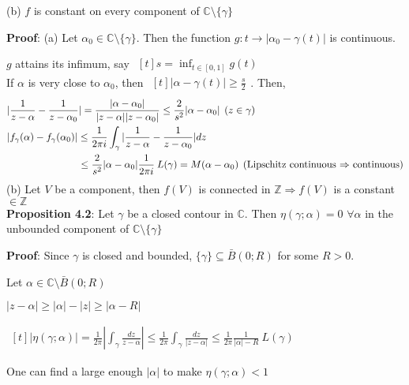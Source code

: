 \documentclass{article}
\begin{document}
\begin{flushleft}
(b) $f$ is constant on every component of $\mathds{C}\setminus \{\gamma\}$

\textbf{Proof}: (a) Let $\alpha_0 \in \mathds{C}\setminus \{\gamma\}$. Then the function $g:t \rightarrow |\alpha_0-\gamma(t)|$ is continuous.

$g$ attains its infimum, say $\begin{aligned}[t] s=\inf_{t\in[0,1]} g(t)\end{aligned}$\\
If $\alpha$ is very close to $\alpha_0$, then $\begin{aligned}[t]|\alpha-\gamma(t)|\geq \frac{s}{2}\end{aligned}$. Then,
\begin{align}
&|\frac{1}{z-\alpha}-\frac{1}{z-\alpha_0}|=\frac{|\alpha-\alpha_0|}{|z-\alpha||z-\alpha_0|}\leq \frac{2}{s^2}|\alpha-\alpha_0| \:\:(z\in \gamma)\nonumber\\
&|f_{\gamma}(\alpha)-f_{\gamma}(\alpha_0)|\leq \frac{1}{2\pi i} \int_{\gamma}^{}|\frac{1}{z-\alpha}-\frac{1}{z-\alpha_0}| dz\nonumber\\
&\hspace{25mm}\leq \frac{2}{s^2}|\alpha -\alpha_0|\frac{1}{2\pi i}\:L(\gamma)=M(\alpha-\alpha_0) \:\: (\text{Lipschitz continuous $\Rightarrow$ continuous})\nonumber
\end{align}
(b) Let $V$ be a component, then $f(V)$ is connected in $\mathds{Z}\Rightarrow f(V)$ is a constant $\in \mathds{Z}$\\
\vspace{3mm}
\textbf{Proposition 4.2}: Let $\gamma$ be a closed contour in $\mathds{C}$. Then $\eta(\gamma;\alpha)=0$ $\forall \alpha$ in the unbounded component of $\mathds{C}\setminus \{\gamma\}$

\textbf{Proof}: Since $\gamma$ is closed and bounded, $\{\gamma\}\subseteq \bar{B}(0;R)$ for some $R>0$.

Let $\alpha \in\mathds{C}\setminus \bar{B}(0;R)$ 

$|z-\alpha|\geq |\alpha|-|z|\geq |\alpha-R|$

$\begin{aligned}[t] |\eta(\gamma;\alpha)|=\frac{1}{2\pi}|\int_{\gamma}^{}\frac{dz}{z-\alpha}| \leq \frac{1}{2\pi} \int_{\gamma}^{}\frac{dz}{|z-\alpha|}\leq \frac{1}{2\pi} \frac{1}{|\alpha|-R}\:L(\gamma)\end{aligned}$

One can find a large enough $|\alpha|$ to make $\eta(\gamma;\alpha)<1$


\end{flushleft}
\end{document}
